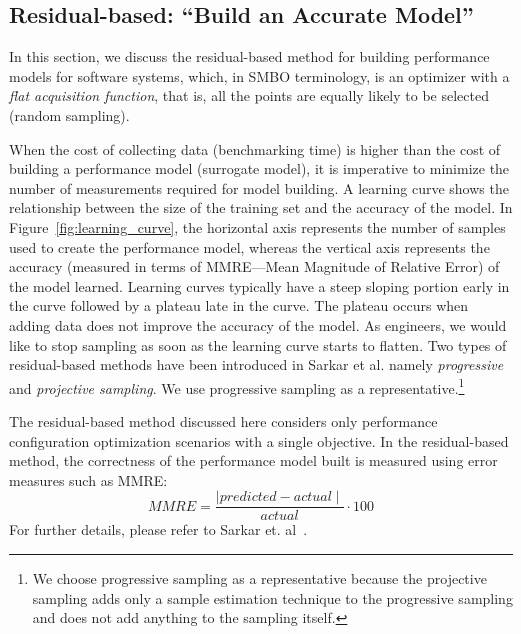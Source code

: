 \subsection{Residual-based: ``Build an Accurate Model''}\label{sec:residual}
In this section, we discuss the residual-based method for building performance models for software systems, which, in SMBO terminology, is an optimizer with a \textit{flat acquisition function}, that is, all the points are equally likely to be selected (random sampling). 

When the cost of collecting data (benchmarking time) is higher than the cost of building a performance model (surrogate model), it is imperative to minimize the number of measurements required for model building. A learning curve shows the relationship between the size of the training set and the accuracy of the model. In Figure~\ref{fig:learning_curve}, the horizontal axis represents the number of samples used to create the performance model, whereas the vertical axis represents the accuracy (measured in terms of MMRE---Mean Magnitude of Relative Error) of the model learned. 
Learning curves typically have a steep sloping portion early in the curve followed by a plateau late in the curve. The plateau occurs when adding data does not improve the accuracy of the model. As engineers, we would like to stop sampling as soon as the learning curve starts to flatten. 
Two types of residual-based methods have been introduced in Sarkar et al. namely \textit{progressive} and \textit{projective sampling}. We use progressive sampling as a representative.\footnote{We choose progressive sampling as a representative because the projective sampling adds only a sample estimation technique to the progressive sampling and does not add anything to the sampling itself.}


The residual-based method discussed here considers only performance configuration optimization scenarios with a single objective. In the residual-based method, the correctness of the performance model built is measured using error measures such as MMRE:
\begin{equation}
\mathit{MMRE}=\frac{\mid\mathit{predicted} - \mathit{actual}\mid}{\mathit{actual}} \cdot 100
\label{eq:err}
\end{equation}
For further details, please refer to Sarkar et. al~\cite{sarkar2015cost}.

